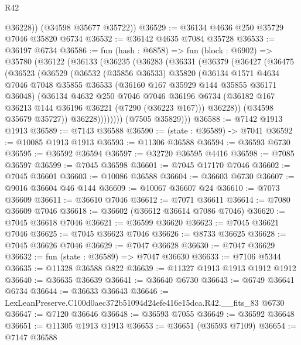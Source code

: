 \begin{lexlean}{R42}
\begin{coremodule}
{          @36228))
      (@34598 @35677 @35722))
@36529 := @36134 @4636 @250 @35729 @7046 @35820 @6734
@36532 := @36142 @4635 @7084 @35728
@36533 := @36197 @6734
@36586 := fun (hash : @6858) =>
  fun (block : @6902) =>
  @35780
    (@36122
      (@36133
        (@36235
          (@36283
            (@36331
              (@36379
                (@36427
                  (@36475
                    (@36523
                      (@36529
                        (@36532
                          (@35856 @36533)
                          @35820
                          (@36134
                            @1571
                            @4634
                            @7046
                            @7048
                            @35855
                            @36533
                            (@36160 @167 @35929 @144 @35855 @36171 @36048)
                            (@36134
                              @4632
                              @250
                              @7046
                              @7046
                              @36196
                              @6734
                              (@36182 @167 @36213 @144 @36196 @36221 (@7290 (@36223 @167)))
                              @36228))
                          (@34598 @35679 @35727))
                        @36228))))))))
        (@7505 @35829)))
@36588 := @7142 @1913 @1913
@36589 := @7143 @36588
@36590 := (state : @36589) -> @7041
@36592 := @10085 @1913 @1913
@36593 := @11306 @36588
@36594 := @36593 @6730
@36595 := @36592 @36594
@36597 := @32720 @36595 @4416
@36598 := @7085 @36597
@36599 := @7045 @36598
@36601 := @7045 @17170 @7046
@36602 := @7045 @36601
@36603 := @10086 @36588
@36604 := @36603 @6730
@36607 := @9016 @36604 @46 @144
@36609 := @10067 @36607 @24
@36610 := @7073 @36609
@36611 := @36610 @7046
@36612 := @7071 @36611
@36614 := @7080 @36609 @7046
@36618 := @36602 (@36612 @36614 @7086 @7046)
@36620 := @7045 @36618 @7046
@36621 := @36599 @36620
@36623 := @7045 @36621 @7046
@36625 := @7045 @36623 @7046
@36626 := @8733 @36625
@36628 := @7045 @36626 @7046
@36629 := @7047 @36628
@36630 := @7047 @36629
@36632 := fun (state : @36589) => @7047 @36630
@36633 := @7106 @5344
@36635 := @11328 @36588 @822
@36639 := @11327 @1913 @1913 @1912 @1912
@36640 := @36635 @36639
@36641 := @36640 @6730
@36643 := @6749 @36641 @6734
@36644 := @36633 @36643
@36646 := LexLeanPreserve.C100d0aec372b51094d24efe416e15dca.R42.__fits_83 @6730
@36647 := @7120 @36646
@36648 := @36593 @7055
@36649 := @36592 @36648
@36651 := @11305 @1913 @1913
@36653 := @36651 (@36593 @7109)
@36654 := @7147 @36588
}
\end{coremodule}
\end{lexlean}
